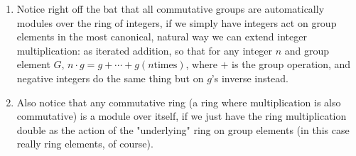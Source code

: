 \documentclass{article}
\begin{document}
\begin{enumerate}
    \begin{enumerate}
        \item Notice right off the bat that all commutative groups are automatically modules over the ring of integers, if we simply have integers act on group elements in the most canonical, natural way we can extend integer multiplication: as iterated addition, so that for any integer $ n $ and group element $ G $, $ n \cdot g = g + \cdots + g (n \text{times}) $, where $ + $ is the group operation, and negative integers do the same thing but on $ g $'s inverse instead.
        \item Also notice that any commutative ring (a ring where multiplication is also commutative) is a module over itself, if we just have the ring multiplication double as the action of the "underlying" ring on group elements (in this case really ring elements, of course).
    \end{enumerate}
\end{enumerate}
\end{document}

